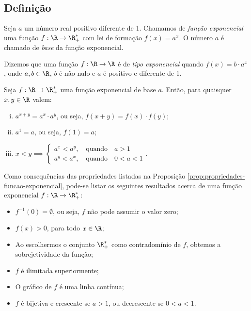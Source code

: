 \subsection{Definição}

\begin{definition}
    Seja $a$ um número real positivo diferente de 1. Chamamos de
\emph{função exponencial} uma função $f: \R \to \R_+^*$ com lei de
formação $f(x) = a^x$. O número $a$ é chamado de \emph{base} da função exponencial.
\end{definition}

\begin{definition}
Dizemos que uma função $f: \R \to \R$ é de \emph{tipo exponencial}
quando $f(x) =b\cdot a^x$, onde $a,b \in\R$, $b$ é não nulo e $a$ é
positivo e diferente de 1.
\end{definition}

\begin{proposition}
\label{prop:propriedades-funcao-exponencial}
Seja $f: \R \to \R_+^*$ uma função exponencial de base $a$.
Então, para quaisquer $x, y \in \R$ valem:
%
\begin{enumerate}[(i)]
  \item  $a^{x+y} = a^x\cdot a^y$, ou seja, $f(x+y) = f(x)\cdot f(y)$;
  \item $a^1 = a$, ou seja, $f(1) = a$;
  \item $x<y \implies \begin{cases} a^x < a^y, \ \ \ \text{ quando } \ \ \ a>1 \\
                                    a^y < a^x, \ \ \ \text{ quando } \ \ \ 0<a<1
                       \end{cases}.$
\end{enumerate}
\end{proposition}

Como consequências das propriedades listadas na Proposição \ref{prop:propriedades-funcao-exponencial},
pode-se listar os seguintes resultados acerca de uma função exponencial $f: \R \to \R_+^*$:
%
\begin{itemize}
    \item $f^{-1}(0) = \emptyset$, ou seja, $f$ não pode assumir o valor
    zero;
    \item $f(x)>0$, para todo $x \in \R$;
    \item Ao escolhermos o conjunto $\R_+^*$ como contradomínio de $f$, obtemos
    a sobrejetividade da função;
    \item $f$ é ilimitada superiormente;
    \item O gráfico de $f$ é uma linha contínua;
    \item $f$ é bijetiva e crescente se $a>1$, ou decrescente se
    $0<a<1$.
\end{itemize}

